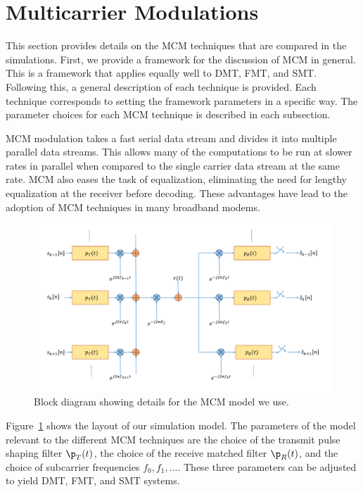 \documentclass[conference]{IEEEtran}
\begin{document}
\section{Multicarrier Modulations}
\label{sec:MCM}

This section provides details on the MCM techniques that are compared in the
simulations. First, we provide a framework for the discussion of MCM in general.
This is a framework that applies equally well to DMT, FMT, and SMT. Following
this, a general description of each technique is provided. Each technique
corresponds to setting the framework parameters in a specific way. The
parameter choices for each MCM technique is described in each subsection.

MCM modulation takes a fast serial data stream and divides it into multiple
parallel data streams. This allows many of the computations to be run at 
slower rates in parallel when compared to the single carrier data stream
at the same rate. MCM also eases the task of equalization, eliminating the 
need for lengthy equalization at the receiver before decoding. These advantages
have lead to the adoption of MCM techniques in many broadband modems. %

\begin{figure}[ht!]
	\centering
	\includegraphics[scale=0.5]{MCM_pic.pdf}
	\caption{Block diagram showing details for the MCM model we use.}
	\label{fig:mcm_model}
\end{figure}

Figure~\ref{fig:mcm_model} shows the layout of our simulation model. The
parameters of the model relevant to the different MCM techniques are the
choice of the transmit pulse shaping filter $\p_T(t)$, the choice of the 
receive matched filter $\p_R(t)$, and the choice of subcarrier frequencies 
$f_0, f_1, ...$. These three parameters can be adjusted to yield DMT, FMT,
and SMT systems.
\end{document}

